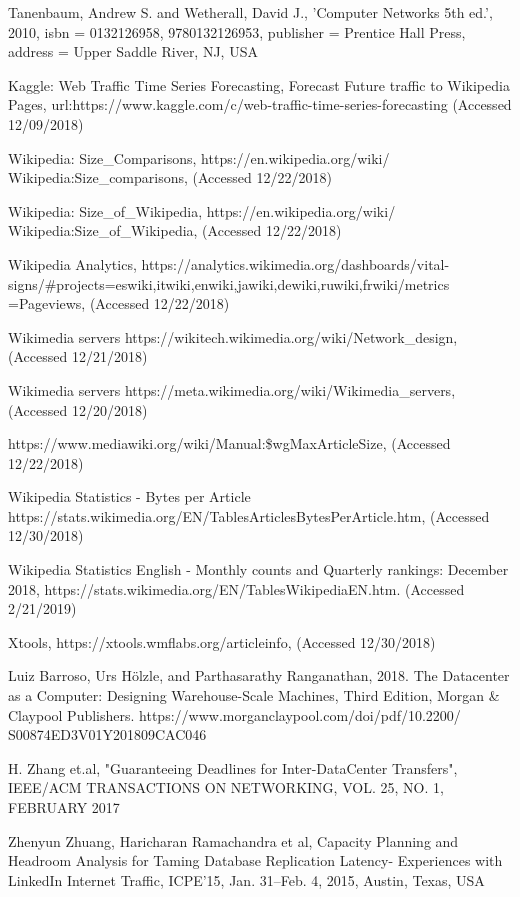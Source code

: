 \documentclass[conference]{IEEEtran}
\begin{document}
\begin{thebibliography}{00}
Tanenbaum, Andrew S. and Wetherall, David J., 'Computer Networks 5th ed.', 2010, isbn = {0132126958, 9780132126953},
publisher = Prentice Hall Press, address = Upper Saddle River, NJ, USA

Kaggle: Web Traffic Time Series Forecasting, Forecast Future traffic to Wikipedia Pages, url:https://www.kaggle.com/c/web-traffic-time-series-forecasting (Accessed 12/09/2018)

Wikipedia: Size\_Comparisons, https://en.wikipedia.org/wiki/ \\
Wikipedia:Size\_comparisons, (Accessed 12/22/2018)

Wikipedia: Size\_of\_Wikipedia, https://en.wikipedia.org/wiki/ \\
Wikipedia:Size\_of\_Wikipedia, (Accessed 12/22/2018)

 Wikipedia Analytics, 
https://analytics.wikimedia.org/dashboards/vital-signs/\#projects=eswiki,itwiki,enwiki,jawiki,dewiki,ruwiki,frwiki/metrics =Pageviews, (Accessed 12/22/2018)

 Wikimedia servers https://wikitech.wikimedia.org/wiki/Network\_design, (Accessed 12/21/2018)

 Wikimedia servers https://meta.wikimedia.org/wiki/Wikimedia\_servers, (Accessed 12/20/2018) 

 https://www.mediawiki.org/wiki/Manual:\$wgMaxArticleSize, (Accessed 12/22/2018)

 Wikipedia Statistics - Bytes per Article https://stats.wikimedia.org/EN/TablesArticlesBytesPerArticle.htm, (Accessed 12/30/2018)

 Wikipedia Statistics English - Monthly counts and Quarterly rankings: December 2018, https://stats.wikimedia.org/EN/TablesWikipediaEN.htm. (Accessed 2/21/2019)

 Xtools, https://xtools.wmflabs.org/articleinfo, (Accessed 12/30/2018)

Luiz Barroso, Urs H\"olzle, and Parthasarathy Ranganathan, 2018. The Datacenter as a Computer: Designing Warehouse-Scale Machines, Third Edition, Morgan \& Claypool Publishers. https://www.morganclaypool.com/doi/pdf/10.2200/  S00874ED3V01Y201809CAC046

H. Zhang et.al, "Guaranteeing Deadlines for Inter-DataCenter Transfers", IEEE/ACM TRANSACTIONS ON NETWORKING, VOL. 25, NO. 1, FEBRUARY 2017

 Zhenyun Zhuang, Haricharan Ramachandra et al, Capacity Planning and Headroom Analysis for Taming Database Replication Latency- Experiences with LinkedIn Internet Traffic, ICPE’15, Jan. 31–Feb. 4, 2015, Austin, Texas, USA

\end{thebibliography}
\end{document}
